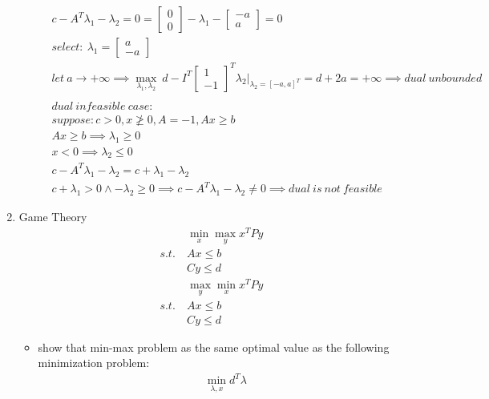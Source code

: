\documentclass[12pt,letter]{article}
\begin{document}
\begin{enumerate}
\begin{itemize}
\begin{align*}
      &c-A^T\lambda_1-\lambda_2 =0=\begin{bmatrix}0\\0\end{bmatrix} - \lambda_1 - \begin{bmatrix}-a\\a\end{bmatrix} = 0\\
      &select:\ \lambda_1 =\begin{bmatrix}a\\-a\end{bmatrix}\\
      &let\ a \to +\infty \implies \max_{\lambda_1,\lambda_2}\ d - I^T\begin{bmatrix}1\\-1\end{bmatrix}^T\lambda_2\bigg|_{\lambda_2=[-a,a]^T} = d + 2a = +\infty \implies dual\ unbounded\\
      \\
      &dual\ infeasible\ case:\\
      &suppose: c > 0, x \not\geq 0, A=-1, Ax \geq b\\
      &Ax \geq b \implies \lambda_1 \geq 0\\
      &x < 0 \implies \lambda_2 \leq 0\\
      &c-A^T\lambda_1-\lambda_2 = c+\lambda_1 - \lambda_2\\
      &c+\lambda_1>0 \wedge -\lambda_2 \geq 0 \implies c-A^T\lambda_1-\lambda_2 \not=0 \implies dual\ is\ not\ feasible
    \end{align*}
  \end{itemize}
\item Game Theory
  \begin{align*}
    &\min_x \max_y x^TPy\\
    s.t.\ &Ax \leq b\\
    &Cy \leq d
  \end{align*}
  \begin{align*}
      &\max_y \min_x x^TPy\\
      s.t.\ &Ax \leq b\\
      &Cy \leq d
    \end{align*}
  \begin{itemize}
  \item show that min-max problem as the same optimal value as the following minimization problem:
    \begin{align*}
      &\min_{\lambda,x} d^T \lambda\\

\end{align*}
\end{itemize}
\end{enumerate}
\end{document}
